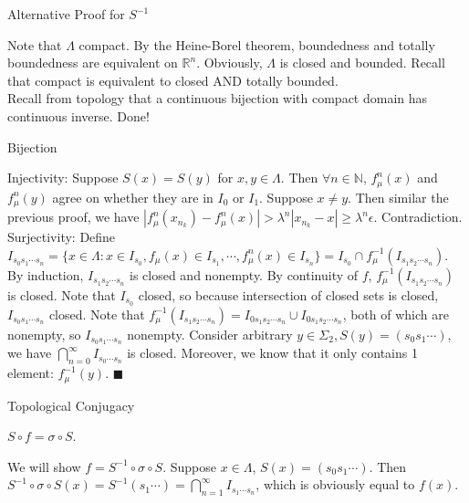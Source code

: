 \documentclass[aspectratio=169]{beamer}
\begin{document}
\begin{frame}{Alternative Proof for $S^{-1}$}
\begin{pf}
    Note that $\Lambda$ compact. By the Heine-Borel theorem, boundedness and totally boundedness are equivalent on $\mathbb{R}^n$. Obviously, $\Lambda$ is closed and bounded. Recall that compact is equivalent to closed AND totally bounded.  \\
    Recall from topology that a continuous bijection with compact domain has continuous inverse. Done! 
\end{pf}
\end{frame}

\begin{frame}{Bijection}
\begin{pf}
    Injectivity: Suppose $S(x)=S(y)$ for $x,y\in \Lambda$. Then $\forall n\in\mathbb{N}$, $f_\mu^n(x)$ and $f_\mu^n(y)$ agree on whether they are in $I_0$ or $I_1$. Suppose $x\neq y$. Then similar the previous proof, we have $|f_\mu^n(x_{n_k})-f_\mu^n(x)| > \lambda^n|x_{n_k}-x| \geq \lambda^n\epsilon$. Contradiction. \\
    Surjectivity: Define $I_{s_0s_1\cdots s_n} = \{x \in\Lambda: x\in I_{s_0}, f_\mu(x)\in I_{s_1}, \cdots, f_\mu^n(x)\in I_{s_n}\} = I_{s_0} \cap f_\mu^{-1}(I_{s_1s_2\cdots s_n})$. By induction, $I_{s_1s_2\cdots s_n}$ is closed and nonempty. By continuity of $f$, $f_\mu^{-1}(I_{s_1s_2\cdots s_n})$ is closed. Note that $I_{s_0}$ closed, so because intersection of closed sets is closed, $I_{s_0s_1\cdots s_n}$ closed. Note that $f_\mu^{-1}(I_{s_1s_2\cdots s_n}) = I_{0s_1s_2\cdots s_n}\cup I_{0s_1s_2\cdots s_n}$, both of which are nonempty, so $I_{s_0s_1\cdots s_n}$ nonempty. Consider arbitrary $y\in\Sigma_2, S(y)=(s_0s_1\cdots)$, we have $\displaystyle\bigcap_{n=0}^\infty I_{s_0\cdots s_n}$ is closed. Moreover, we know that it only contains 1 element: $f_\mu^{-1}(y)$. $\blacksquare$
\end{pf}
\end{frame}

\begin{frame}{Topological Conjugacy}
\begin{thrm}
    $S \circ f = \sigma\circ S$. 
\end{thrm}
\begin{pf}
    We will show $f = S^{-1}\circ\sigma\circ S$. Suppose $x\in\Lambda$, $S(x)=(s_0s_1\cdots)$. Then $S^{-1}\circ\sigma\circ S(x) = S^{-1}(s_1\cdots) = \displaystyle\bigcap_{n=1}^\infty I_{s_1\cdots s_n}$, which is obviously equal to $f(x)$. 
\end{pf}
\end{frame}
\end{document}
